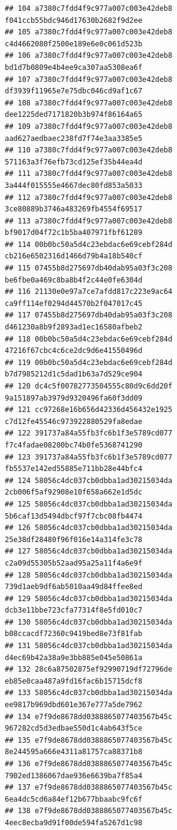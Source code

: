 \documentclass[]{article}
\begin{document}
\begin{verbatim}
## 104 a7380c7fdd4f9c977a007c003e42deb8   f041ccb55bdc946d17630b2682f9d2ee
## 105 a7380c7fdd4f9c977a007c003e42deb8   c4d4662080f2500e189e6e0c061d523b
## 106 a7380c7fdd4f9c977a007c003e42deb8   bd1d7b0809e4b4ee9ca307aa5308ea6f
## 107 a7380c7fdd4f9c977a007c003e42deb8   df3939f11965e7e75dbc046cd9af1c67
## 108 a7380c7fdd4f9c977a007c003e42deb8   dee1225ded7171820b3b974f86164a65
## 109 a7380c7fdd4f9c977a007c003e42deb8   aad627aedbaec238fd7f74e3aa3385e5
## 110 a7380c7fdd4f9c977a007c003e42deb8   571163a3f76efb73cd125ef35b44ea4d
## 111 a7380c7fdd4f9c977a007c003e42deb8   3a444f015555e4667dec80fd853a5033
## 112 a7380c7fdd4f9c977a007c003e42deb8   3ce80889b3746a483269fb4554f69517
## 113 a7380c7fdd4f9c977a007c003e42deb8   bf9017d04f72c1b5ba407971fbf61289
## 114 00b0bc50a5d4c23ebdac6e69cebf284d   cb216e6502316d1466d79b4a18b540cf
## 115 07455b8d275697db40dab95a03f3c208   be6fbe0a469c8ba8b4f2c44e0fe6304d
## 116 21130e0e97a7ce7afdd817c223e9ac64   ca9ff114ef0294d44570b2f047017c45
## 117 07455b8d275697db40dab95a03f3c208   d461230a8b9f2893ad1ec16580afbeb2
## 118 00b0bc50a5d4c23ebdac6e69cebf284d   47216f67cbc4c6ce2dc9d6e41550496d
## 119 00b0bc50a5d4c23ebdac6e69cebf284d   b7d7985212d1c5dad1b63a7d529ce904
## 120 dc4c5f00782773504555c80d9c6dd20f   9a151897ab3979d9320496fa60f3dd09
## 121 cc97268e16b656d42336d456432e1925   c7d12fe45546c973922880529fa8edae
## 122 391737a84a55fb3fc6b1f3e5789cd077   f7c4fadae08200bc74b0fe5368741290
## 123 391737a84a55fb3fc6b1f3e5789cd077   fb5537e142ed55885e711bb28e44bfc4
## 124 58056c4dc037cb0dbba1ad30215034da   2cb006f5af92908e10f658a662e1d5dc
## 125 58056c4dc037cb0dbba1ad30215034da   5b6caf13d5494dbcf97f7cbc08fb4474
## 126 58056c4dc037cb0dbba1ad30215034da   25e38df28480f96f016e14a314fe3c78
## 127 58056c4dc037cb0dbba1ad30215034da   c2a09d55305b52aad95a25a11f4a6e9f
## 128 58056c4dc037cb0dbba1ad30215034da   739d1aeb9df6ab5010aa49d84ffee8ed
## 129 58056c4dc037cb0dbba1ad30215034da   dcb3e11bbe723cfa77314f8e5fd010c7
## 130 58056c4dc037cb0dbba1ad30215034da   b08ccacdf72360c9419bed8e73f81fab
## 131 58056c4dc037cb0dbba1ad30215034da   d4ec69b42a38a9e3bb885e045e50861a
## 132 28c6a87502875ef92990719df72796de   eb85e0caa487a9fd16fac6b15715dcf8
## 133 58056c4dc037cb0dbba1ad30215034da   ee9817b969dbd601e367e777a5de7962
## 134 e7f9de8678dd0388865077403567b45c   967282cd5d3edbae550d1c4ab643f5ce
## 135 e7f9de8678dd0388865077403567b45c   8e244595a666e4311a81757ca88371b8
## 136 e7f9de8678dd0388865077403567b45c   7902ed1386067dae936e6639ba7f85a4
## 137 e7f9de8678dd0388865077403567b45c   6ea4dc5cd6a84ef12b677bbaabc9fc6f
## 138 e7f9de8678dd0388865077403567b45c   4eec8ecba9d91f00de594fa5267d1c98

\end{verbatim}
\end{document}
